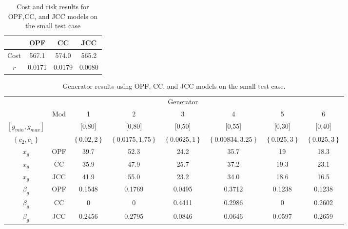 \begin{table}
\centering
\begin{tabular}{ |c| c c c |}
\hline
& OPF & CC & JCC \\
\hline
\hline
Cost & 567.1 & 574.0 & 565.2\\
$r$ & 0.0171 & 0.0179 & 0.0080\\
\hline
\end{tabular}
\caption{Cost and risk results for OPF,CC, and JCC models on the small test case}\label{solve_results}
\end{table}

\begin{table}
\centering
\small
\begin{tabular}{| c| c |c c c c c c |}
\hline
 &     &   &   &  Generator & & & \\
 & Mod & 1 & 2 & 3 & 4 & 5 & 6 \\
\hline
\hline
$\left[ g_{min}, g_{max} \right]$& & [0,80]&[0,80] &[0,50] &[0,55] &[0,30] &[0,40]  \\
$\left\{ c_2, c_1 \right\}$ && $\left\{0.02,2\right\}$  &$\left\{0.0175,1.75\right\}$ &$\left\{0.0625,1\right\}$ &$\left\{0.00834,3.25\right\}$ &$\left\{0.025,3\right\}$ &$\left\{0.025,3\right\}$  \\
\hline
\hline
$x_g$ &OPF& 39.7  &  52.3  &  24.2  &  35.7  &  19  &  18.3   \\
$x_g$ &CC& 35.9  &  47.9  &  25.7  &  37.2  &  19.3  &  23.1    \\
$x_g$ &JCC& 41.9  &  55.0  &  23.2  &  34.0  &  18.6  &  16.5    \\
\hline
$\beta_g$ &OPF& 0.1548  &  0.1769  &  0.0495  &  0.3712  &  0.1238  &  0.1238    \\
$\beta_g$ &CC& 0  &  0  &  0.4411  &  0.2986  &  0  &  0.2602   \\
$\beta_g$ &JCC& 0.2456  &  0.2795  &  0.0846  &  0.0646  &  0.0597  &  0.2659   \\
\hline
\end{tabular}
\caption{Generator results using OPF, CC, and JCC models on the small test case.}\label{solve_one}
\end{table}

